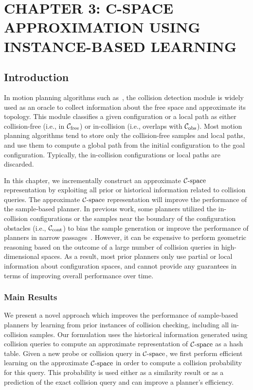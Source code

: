 \chapter[C-SPACE APPROXIMATION USING INSTANCE-BASED LEARNING]{CHAPTER 3:  C-SPACE APPROXIMATION USING INSTANCE-BASED LEARNING} 
\label{chp:IBL}

\section{Introduction}
In motion planning algorithms such as~\cite{Kavraki96, Kuffner00}, the collision detection module is widely used as an oracle to collect information about the free space and approximate its topology. This module classifies a given configuration or a local path as either collision-free (i.e., in $\mathcal C_{\text{free}}$) or in-collision (i.e., overlaps with $\mathcal C_{\text{obs}}$). Most motion planning algorithms tend to store only the collision-free samples and local paths, and use them to compute a global path from the initial configuration to the goal configuration. Typically, the in-collision configurations or local paths are discarded.

In this chapter, we incrementally construct an approximate $\mathcal C\text{-space}$ representation by exploiting all prior or historical information related to collision queries. The approximate $\mathcal C\text{-space}$ representation will improve the performance of the sample-based planner. In previous work, some planners utilized the in-collision configurations or the samples near the boundary of the configuration obstacles (i.e., $\mathcal C_\text{cont}$) to bias the sample generation or improve the performance of planners in narrow passages~\cite{Boor:1999:ICRA,Jory:2011:IROS,Rodriguez:2006,Zheng:2005}. However, it can be expensive to perform geometric reasoning based on the outcome of a large number of collision queries in high-dimensional spaces. As a result, most prior planners only use partial or local information about configuration spaces, and cannot provide any guarantees in terms of improving overall performance over time.
\subsection{Main Results}
We present a novel approach which improves the performance of sample-based planners by learning from prior instances of collision checking, including all in-collision samples. Our formulation uses the historical information generated using collision queries to compute an approximate representation of $\mathcal C\text{-space}$ as a hash table. Given a new probe or collision query in $\mathcal C\text{-space}$, we first perform efficient learning on the approximate $\mathcal C\text{-space}$ in order to compute a collision probability for this query. This probability is used either as a similarity result or as a prediction of the exact collision query and can improve a planner's efficiency.

